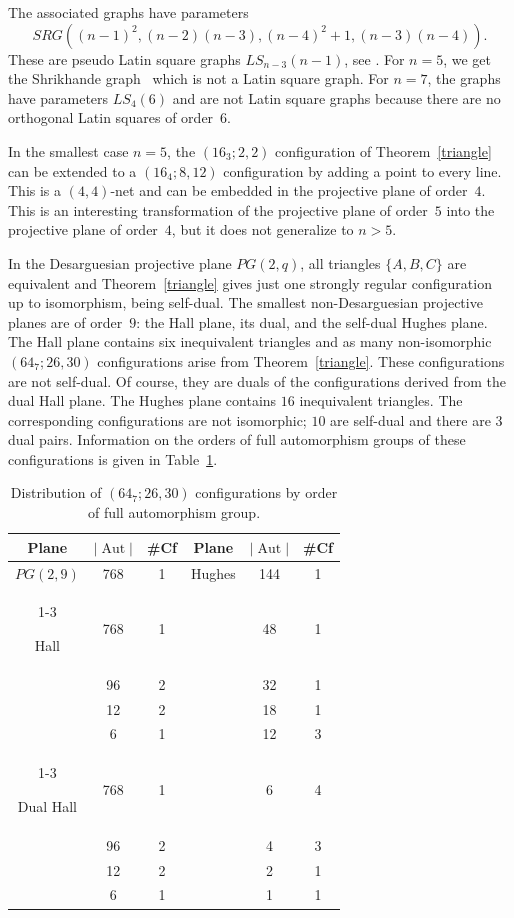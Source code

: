 \documentclass[12pt, reqno]{amsart}
\def\Aut{\mathop{\mathrm{Aut}}}
\begin{document}
The associated graphs have parameters
$$SRG((n-1)^2,(n-2)(n-3),(n-4)^2+1,(n-3)(n-4)).$$
These are pseudo Latin square graphs $LS_{n-3}(n-1)$, see \cite[Section 8.4.2]{BvM21}.
For $n=5$, we get the Shrikhande graph~\cite{SSS59} which is not a Latin square graph.
For $n=7$, the graphs have parameters $LS_4(6)$ and are not Latin square graphs
because there are no orthogonal Latin squares of order~$6$.

In the smallest case $n=5$, the $(16_3;2,2)$ configuration of Theorem~\ref{triangle}
can be extended to a $(16_4;8,12)$ configuration by adding a point to every line.
This is a $(4,4)$-net and can be embedded in the projective plane of order~$4$.
This is an interesting transformation of the projective plane of order~$5$ into the
projective plane of order~$4$, but it does not generalize to $n>5$.

In the Desarguesian projective plane $PG(2,q)$, all triangles $\{A,B,C\}$
are equivalent and Theorem~\ref{triangle} gives just one
strongly regular configuration up to isomorphism, being self-dual. The
smallest non-De\-sar\-guesian projective planes are of order~$9$: the Hall
plane, its dual, and the self-dual Hughes plane.  The Hall plane contains
six inequivalent triangles and as many non-isomorphic $(64_7;26,30)$ configurations
arise from Theorem~\ref{triangle}. These
configurations are not self-dual. Of course, they are duals of the configurations
derived from the dual Hall plane. The Hughes plane contains $16$ inequivalent
triangles. The corresponding configurations are not isomorphic; $10$
are self-dual and there are $3$ dual pairs. Information on the orders of full
automorphism groups of these configurations is given in Table~\ref{table64}.

\begin{table}[h]
\begin{tabular}{|c c c|c c c|}
\hline
Plane & $|\Aut|$ & \#Cf & Plane & $|\Aut|$ & \#Cf \\
\hline
\rule{0mm}{12pt}$PG(2,9)$ & 768 & 1 & Hughes & 144 & 1 \\
\cline{1-3}
\rule{0mm}{12pt}Hall & 768 & 1 & & 48 & 1 \\
\rule{0mm}{11pt} & 96 & 2 & & 32 & 1 \\
\rule{0mm}{11pt} & 12 & 2 & & 18 & 1 \\
\rule{0mm}{11pt} & 6 & 1 & & 12 & 3 \\
\cline{1-3}
\rule{0mm}{12pt}Dual Hall & 768 & 1 & & 6 & 4 \\
\rule{0mm}{11pt} & 96 & 2 & & 4 & 3 \\
\rule{0mm}{11pt} & 12 & 2 & & 2 & 1 \\
\rule{0mm}{11pt} & 6 & 1 & & 1 & 1 \\
\hline
\end{tabular}
\vskip 3mm \caption{Distribution of $(64_7;26,30)$ configurations %
by order of full automorphism group.}\label{table64}
\end{table}
\end{document}
